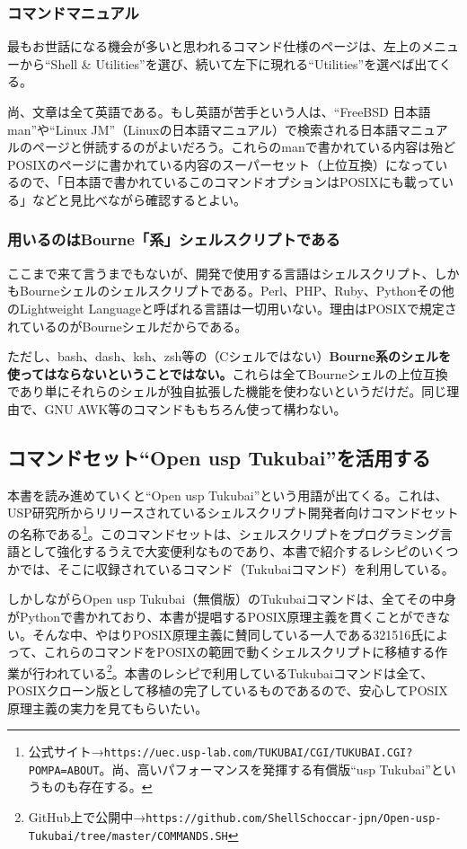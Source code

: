 \subsubsection*{コマンドマニュアル}

最もお世話になる機会が多いと思われるコマンド仕様のページは、左上のメニューから``Shell \&{} Utilities''を選び、続いて左下に現れる``Utilities''を選べば出てくる。

尚、文章は全て英語である。もし英語が苦手という人は、``FreeBSD 日本語 man''や``Linux JM''（Linuxの日本語マニュアル）で検索される日本語マニュアルのページと併読するのがよいだろう。これらのmanで書かれている内容は殆どPOSIXのページに書かれている内容のスーパーセット（上位互換）になっているので、「日本語で書かれているこのコマンドオプションはPOSIXにも載っている」などと見比べながら確認するとよい。

\subsubsection*{用いるのはBourne「系」シェルスクリプトである}

ここまで来て言うまでもないが、開発で使用する言語はシェルスクリプト、しかもBourneシェルのシェルスクリプトである。Perl、PHP、Ruby、Pythonその他のLightweight Languageと呼ばれる言語は一切用いない。理由はPOSIXで規定されているのがBourneシェルだからである。

ただし、bash、dash、ksh、zsh等の（Cシェルではない）\textbf{Bourne系のシェルを使ってはならないということではない。}これらは全てBourneシェルの上位互換であり単にそれらのシェルが独自拡張した機能を使わないというだけだ。同じ理由で、GNU AWK等のコマンドももちろん使って構わない。

\subsection*{コマンドセット``Open usp Tukubai''を活用する}

本書を読み進めていくと``Open usp Tukubai''という用語が出てくる。これは、USP研究所からリリースされているシェルスクリプト開発者向けコマンドセットの名称である\footnote{公式サイト→\verb|https://uec.usp-lab.com/TUKUBAI/CGI/TUKUBAI.CGI?POMPA=ABOUT|。尚、高いパフォーマンスを発揮する有償版``usp Tukubai''というものも存在する。}。このコマンドセットは、シェルスクリプトをプログラミング言語として強化するうえで大変便利なものであり、本書で紹介するレシピのいくつかでは、そこに収録されているコマンド（Tukubaiコマンド）を利用している。

しかしながらOpen usp Tukubai（無償版）のTukubaiコマンドは、全てその中身がPythonで書かれており、本書が提唱するPOSIX原理主義を貫くことができない。そんな中、やはりPOSIX原理主義に賛同している一人である321516氏によって、これらのコマンドをPOSIXの範囲で動くシェルスクリプトに移植する作業が行われている\footnote{GitHub上で公開中→\verb|https://github.com/ShellSchoccar-jpn/Open-usp-Tukubai/tree/master/COMMANDS.SH|}。本書のレシピで利用しているTukubaiコマンドは全て、POSIXクローン版として移植の完了しているものであるので、安心してPOSIX原理主義の実力を見てもらいたい。

